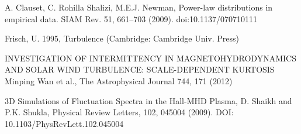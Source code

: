 \documentclass[12pt]{iopart}
\begin{document}
\begin{thebibliography}{10}
A. Clauset, C. Rohilla Shalizi, M.E.J. Newman, Power-law distributions in empirical data. SIAM Rev. 51, 661–703 (2009). doi:10.1137/070710111

Frisch, U. 1995, Turbulence (Cambridge: Cambridge Univ. Press)

INVESTIGATION OF INTERMITTENCY IN MAGNETOHYDRODYNAMICS AND SOLAR WIND TURBULENCE: SCALE-DEPENDENT KURTOSIS
Minping Wan et al., The Astrophysical Journal 744, 171 (2012)

3D Simulations of Fluctuation Spectra in the Hall-MHD Plasma, D. Shaikh and P.K. Shukla, Physical Review Letters, 102, 045004 (2009). DOI:	10.1103/PhysRevLett.102.045004

\end{thebibliography}
\end{document}
